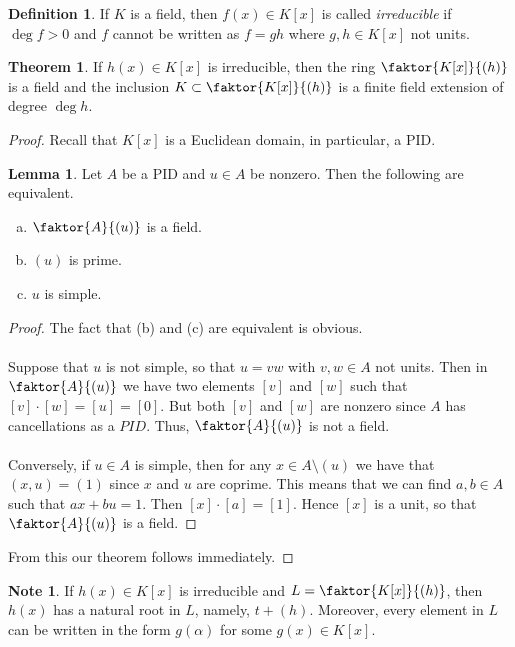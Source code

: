 \documentclass[10pt,letterpaper,cm]{nupset}
\theoremstyle{definition}
\newtheorem*{definition}{Definition}
\newtheorem{note}{Note}
\newtheorem{theorem}{Theorem}
\newtheorem{lemma}{Lemma}
\newcommand{\1}{\mathbf{1}}
\newcommand{\0}{\vec 0}
\begin{document}
\begin{definition}
If $K$ is a field, then $f(x) \in K[x]$ is called \textit{irreducible} if $\deg{f}>0$ and $f$ cannot be written as $f=gh$ where $g,h\in K[x]$ not units. 
\end{definition}

\begin{theorem}
If $h(x) \in K[x]$ is irreducible, then the ring $\faktor{K[x]}{(h)}$ is a field and the inclusion $K \subset \faktor{K[x]}{(h)}$ is a finite field extension of degree $\deg{h}$.
\end{theorem}
\begin{proof}
Recall that $K[x]$ is a Euclidean domain, in particular, a PID.
\begin{lemma}
Let $A$ be a PID and $u\in A$ be nonzero. Then the following are equivalent.
\begin{enumerate}[(a)]
\item $\faktor{A}{(u)}$ is a field.
\item $(u)$ is prime.
\item$u$ is simple.
\end{enumerate}
\end{lemma}
\begin{proof}
The fact that (b) and (c) are equivalent is obvious. 
\\ \\ Suppose that $u$ is not simple, so that $u= vw$ with $v,w \in A$ not units. Then in $\faktor{A}{(u)}$ we have two elements $[v]$ and $[w]$ such that $[v]\cdot [w] = [u] = [0]$. But both $[v]$ and $[w]$ are nonzero since $A$ has cancellations as a $PID$. Thus, $\faktor{A}{(u)}$ is not a field.
\\ \\ Conversely, if $u\in A$ is simple, then for any $x\in A\setminus (u)$ we have that $(x,u) = (1)$ since $x$ and $u$ are coprime. This means that we can find $a,b\in A$ such that $ax + bu =1$. Then $[x]\cdot[a] = [1]$. Hence $[x]$ is a unit, so that $\faktor{A}{(u)}$ is a field. 
\end{proof}$ $From this our theorem follows immediately. 
\end{proof}

\begin{note}
If $h(x) \in K[x]$ is irreducible  and $L = \faktor{K[x]}{(h)}$, then $h(x)$ has a natural root in $L$, namely, $t + (h)$. Moreover, every element in $L$ can be written in the form $g(\alpha)$ for some $g(x) \in K[x]$.
\end{note}
\end{document}
